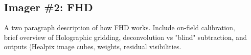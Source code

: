 \subsection{Imager \#2: FHD}
A two paragraph description of how FHD works. Include on-field calibration, brief overview of Holographic gridding, deconvolution vs "blind" subtraction, and outputs (Healpix image cubes, weights, residual visibilities.
